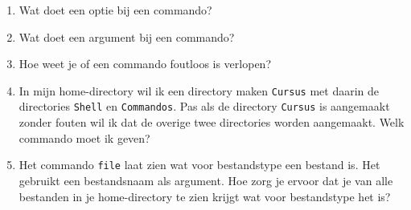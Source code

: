 \begin{enumerate}
\item Wat doet een optie bij een commando?
\item Wat doet een argument bij een commando?
\item Hoe weet je of een commando foutloos is verlopen?
\item In mijn home-directory wil ik een directory maken \texttt{Cursus} met daarin de directories \texttt{Shell} en \texttt{Commandos}. Pas als de directory \texttt{Cursus} is aangemaakt zonder fouten wil ik dat de overige twee directories worden aangemaakt. Welk commando moet ik geven?
\item Het commando \texttt{file} laat zien wat voor bestandstype een bestand is. Het gebruikt een bestandsnaam als argument. Hoe zorg je ervoor dat je van alle bestanden in je home-directory te zien krijgt wat voor bestandstype het is?
\end{enumerate}
